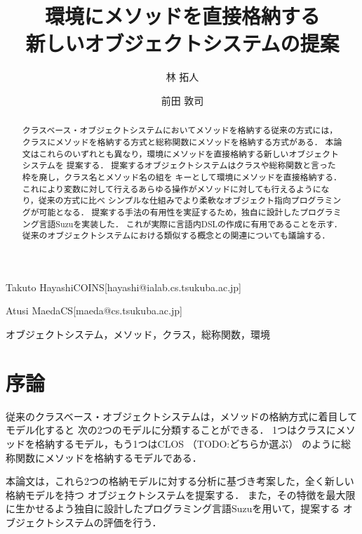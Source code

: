 \documentclass{ipsjprosym}
\begin{document}
\title{環境にメソッドを直接格納する \\ 新しいオブジェクトシステムの提案}


\author{林 拓人}{Takuto Hayashi}{COINS}[hayashi@ialab.cs.tsukuba.ac.jp]
\author{前田 敦司}{Atusi Maeda}{CS}[maeda@cs.tsukuba.ac.jp]

\begin{abstract}
クラスベース・オブジェクトシステムにおいてメソッドを格納する従来の方式には，
クラスにメソッドを格納する方式と総称関数にメソッドを格納する方式がある．
本論文はこれらのいずれとも異なり，環境にメソッドを直接格納する新しいオブジェクトシステムを
提案する．
提案するオブジェクトシステムはクラスや総称関数と言った枠を廃し，クラス名とメソッド名の組を
キーとして環境にメソッドを直接格納する．
これにより変数に対して行えるあらゆる操作がメソッドに対しても行えるようになり，従来の方式に比べ
シンプルな仕組みでより柔軟なオブジェクト指向プログラミングが可能となる．
提案する手法の有用性を実証するため，独自に設計したプログラミング言語Suzuを実装した．
これが実際に言語内DSLの作成に有用であることを示す．
従来のオブジェクトシステムにおける類似する概念との関連についても議論する．
\end{abstract}

\begin{jkeyword}
オブジェクトシステム，メソッド，クラス，総称関数，環境
\end{jkeyword}

\maketitle

\section{序論}

従来のクラスベース・オブジェクトシステムは，メソッドの格納方式に着目してモデル化すると
次の2つのモデルに分類することができる．
1つはクラスにメソッドを格納するモデル，もう1つはCLOS
\cite{Ida:2010, DeMichiel:1987:CLO:646147.679028}（TODO:どちらか選ぶ）
のように総称関数にメソッドを格納するモデルである．

本論文は，これら2つの格納モデルに対する分析に基づき考案した，全く新しい格納モデルを持つ
オブジェクトシステムを提案する．
また，その特徴を最大限に生かせるよう独自に設計したプログラミング言語Suzuを用いて，提案する
オブジェクトシステムの評価を行う．
\end{document}
